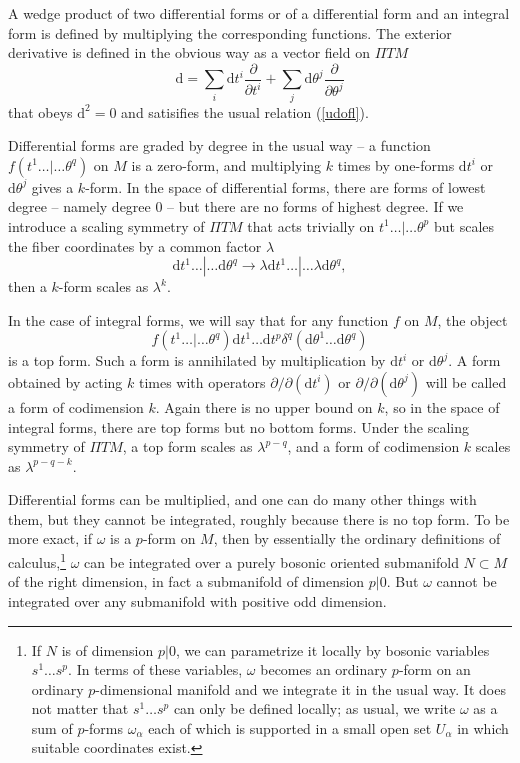 \documentclass[11pt,a4paper]{article}
\def\d{{\mathrm d}}
\def\Pi{\varPi}
\begin{document}
A wedge product of two differential forms
or of a differential form and an integral form is defined by multiplying the corresponding functions.  
The exterior derivative is defined in the obvious way as a vector field on ${\Pi} TM$
\begin{equation}\label{ormoc}\d=\sum_i \d t^i\frac{\partial}{\partial t^i}+\sum_j\d\theta^j\frac{\partial}{\partial\theta^j}\end{equation}
that obeys $\d^2=0$ and satisifies the usual relation (\ref{udofl}).

Differential forms are graded by degree in the usual way -- a function $f(t^1\dots|\dots\theta^q)$ on $M$ is a zero-form,
and multiplying $k$ times by one-forms $\d t^i$ or $\d\theta^j$  gives a $k$-form.  In the space of differential forms, there are 
forms of lowest degree -- namely degree 0 -- but there are no forms of highest degree.  If we introduce a scaling symmetry of ${\Pi} TM$
that acts trivially on $t^1\dots|\dots\theta^p$ but scales the fiber coordinates by a common factor $\lambda$
\begin{equation}\label{dromo}\d t^1\dots|\dots\d\theta^q\to \lambda\d  t^1\dots|\dots\lambda \d\theta^q,\end{equation} then a $k$-form
scales as $\lambda^k$.

In the case of integral forms, we will say that for any function $f$ on $M$, the object
\begin{equation}\label{topf}f(t^1\dots|\dots\theta^q)\d t^1\dots \d t^p\delta^q(\d\theta^1\dots\d\theta^q)\end{equation}
 is a top form.  Such a form is annihilated by multiplication by $\d t^i$ or $\d\theta^j$. 
A form obtained by acting $k$ times with operators $\partial/\partial(\d t^i)$ or $\partial/\partial (\d\theta^j)$ will be called a form of
codimension $k$.   Again there is no upper bound on $k$, so in the space of integral forms, there are top forms but no bottom forms.
Under the scaling symmetry of ${\Pi} TM$, a top form scales as $\lambda^{p-q}$, and a form of codimension $k$ scales as $\lambda^{p-q-k}$.

Differential forms can be multiplied, and one can do many other things with them,  but they cannot be integrated, roughly because there is no top form. 
To be more exact, if $\omega$ is a $p$-form on $M$, then by essentially the ordinary definitions of calculus,\footnote{If $N$ is of dimension $p|0$, we can 
parametrize it locally by bosonic variables $s^1\dots s^p$.  In terms of these variables, $\omega$ becomes an ordinary $p$-form on an ordinary  $p$-dimensional manifold
and we integrate it in the usual way.  It does not matter that $s^1\dots s^p$ can only be defined locally; as usual, we write $\omega$ as a sum of $p$-forms $\omega_\alpha$
each of which is supported in a small open set $U_\alpha$ in which suitable coordinates exist.} 
$\omega$ can be integrated over a purely bosonic oriented submanifold $N\subset M$ of the right dimension, in fact a submanifold of dimension $p|0$.  But $\omega$ cannot be integrated over any submanifold with positive odd dimension.
\end{document}
